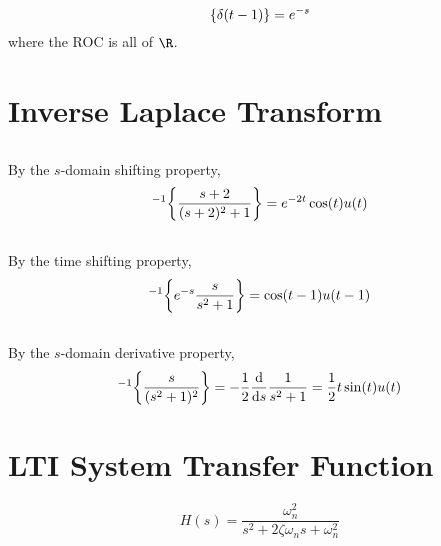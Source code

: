 \documentclass{article}
\let\L\relax
\DeclareMathOperator{\L}{\mathcal{L}}
\begin{document}
\subsection{}

\begin{equation}
    \L\{\delta(t - 1)\} = e^{-s}
\end{equation}
where the ROC is all of \(\R\).

\section{Inverse Laplace Transform}

\subsection{}

By the \(s\)-domain shifting property,
\begin{equation}
    \L^{-1}\qty{\frac{s + 2}{(s + 2)^2 + 1}} = e^{-2t} \cos(t) u(t)
\end{equation}

\subsection{}

By the time shifting property,
\begin{equation}
    \L^{-1}\qty{e^{-s} \frac{s}{s^2 + 1}} = \cos(t - 1) u(t - 1)
\end{equation}

\subsection{}

By the \(s\)-domain derivative property,
\begin{equation}
    \L^{-1}\qty{\frac{s}{(s^2 + 1)^2}} = -\frac{1}{2} \dv{s} \frac{1}{s^2 + 1} = \frac{1}{2} t \sin(t) u(t)
\end{equation}

\section{LTI System Transfer Function}

\begin{equation}
    H(s) = \frac{\omega_n^2}{s^2 + 2\zeta \omega_n s + \omega_n^2}
\end{equation}

\subsection{}
\end{document}
